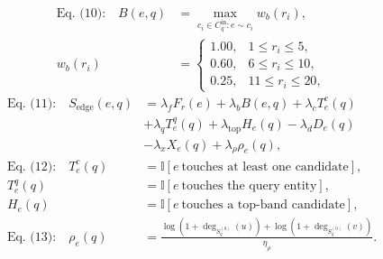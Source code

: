 \documentclass[11pt]{article}
\begin{document}
    \[
    \begin{aligned}
    \text{Eq. (10):}\quad
    B(e,q)&=\max_{c_i\in C^{\mathrm{in}}_q: e\sim c_i}w_b(r_i),\\
    w_b(r_i)&=
    \begin{cases}
    1.00, & 1\le r_i\le5,\\
    0.60, & 6\le r_i\le10,\\
    0.25, & 11\le r_i\le20,
    \end{cases}
    \end{aligned}
    \]
    \[
    \begin{aligned}
    \text{Eq. (11):}\quad
    S_{\mathrm{edge}}(e,q)&=
    \lambda_fF_r(e)+\lambda_bB(e,q)+\lambda_cT^c_e(q)\\
    &+\lambda_qT^q_e(q)+\lambda_{\mathrm{top}}H_e(q)-\lambda_dD_e(q)\\
    &-\lambda_xX_e(q)+\lambda_\rho\rho_e(q),\\
    \text{Eq. (12):}\quad
    T^c_e(q)&=\mathbb{I}[e\ \text{touches at least one candidate}],\\
    T^q_e(q)&=\mathbb{I}[e\ \text{touches the query entity}],\\
    H_e(q)&=\mathbb{I}[e\ \text{touches a top-band candidate}],\\
    \text{Eq. (13):}\quad
    \rho_e(q)&=\frac{\log(1+\deg_{S^{(0)}_q}(u))+\log(1+\deg_{S^{(0)}_q}(v))}{\eta_\rho}.
    \end{aligned}
    \]
    
\end{document}
